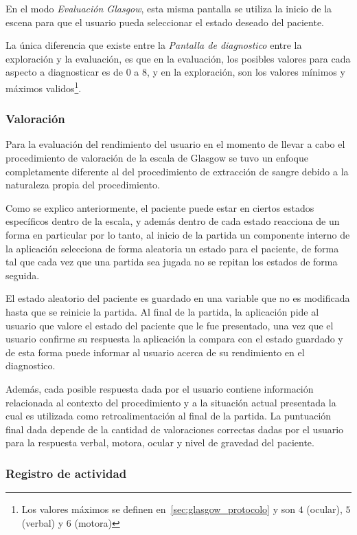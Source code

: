 En el modo \emph{Evaluación Glasgow}, esta misma pantalla se utiliza la inicio
de la escena para que el usuario pueda seleccionar el estado deseado del
paciente.

La única diferencia que existe entre la \emph{Pantalla de diagnostico} entre la
exploración y la evaluación, es que en la evaluación, los posibles valores para
cada aspecto a diagnosticar es de $0$ a $8$, y en la exploración, son los
valores mínimos y máximos validos\footnote{Los valores máximos se definen
    en~\ref{sec:glasgow_protocolo} y son $4$ (ocular), $5$ (verbal) y $6$
    (motora)}.

\subsubsection{Valoración}
\label{sec:puntuacion_glasgow}

Para la evaluación del rendimiento del usuario en el momento de llevar a cabo el
procedimiento de valoración de la escala de Glasgow se tuvo un enfoque
completamente diferente al del procedimiento de extracción de sangre debido a la
naturaleza propia del procedimiento. 

Como se explico anteriormente, el paciente puede estar en ciertos estados
específicos dentro de la escala, y además dentro de cada estado reacciona de un
forma en particular por lo tanto, al inicio de la partida un componente interno
de la aplicación selecciona de forma aleatoria un estado para el paciente, de
forma tal que cada vez que una partida sea jugada no se repitan los estados de
forma seguida.

El estado aleatorio del paciente es guardado en una variable que no es
modificada hasta que se reinicie la partida. Al final de la partida, la
aplicación pide al usuario que valore el estado del paciente que le fue
presentado, una vez que el usuario confirme su respuesta la aplicación la
compara con el estado guardado y de esta forma puede informar al usuario acerca
de su rendimiento en el diagnostico.

Además, cada posible respuesta dada por el usuario contiene información
relacionada al contexto del procedimiento y a la situación actual presentada la
cual es utilizada como retroalimentación al final de la partida. La puntuación
final dada depende de la cantidad de valoraciones correctas dadas por el usuario
para la respuesta verbal, motora, ocular y nivel de gravedad del paciente.

\subsubsection{Registro de actividad}

